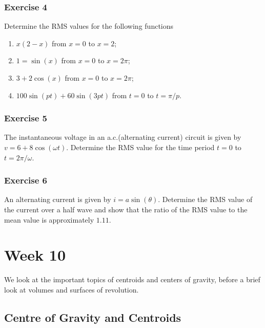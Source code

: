 \documentclass[
  11pt,
  oneside]{book}
\providecommand{\tightlist}{%
  \setlength{\itemsep}{0pt}\setlength{\parskip}{0pt}}
\newcommand{\slide}{}
\theoremstyle{definition}
\theoremstyle{definition}
\theoremstyle{definition}
\theoremstyle{definition}
\theoremstyle{remark}
\begin{document}
\subsection*{Exercise 4}\label{exercise-4-5}

Determine the RMS values for the following functions

\begin{enumerate}
\def\labelenumi{\arabic{enumi}.}
\tightlist
\item
  \(x(2-x)\) from \(x=0\) to \(x=2\);
\item
  \(1=\sin(x)\) from \(x=0\) to \(x=2\pi\);
\item
  \(3+2\cos(x)\) from \(x=0\) to \(x=2\pi\);
\item
  \(100\sin(pt)+60\sin(3pt)\) from \(t=0\) to \(t=\pi/p\).
\end{enumerate}

\slide

\subsection*{Exercise 5}\label{exercise-5-4}

The instantaneous voltage in an a.c.(alternating current) circuit is given by \(v = 6 + 8\cos(\omega t)\).
Determine the RMS value for the time period \(t = 0\) to \(t = 2\pi/\omega\).

\slide

\subsection*{Exercise 6}\label{exercise-6-4}

An alternating current is given by \(i = a\sin(\theta)\). Determine the RMS value of the current over a half wave and show that the ratio of the RMS value to the mean value is approximately \(1.11\).

\chapter{Week 10}\label{week-ten}

We look at the important topics of centroids and centers of gravity, before a brief look at volumes and surfaces of revolution.

\slide

\section{Centre of Gravity and Centroids}\label{centre-of-gravity-and-centroids}
\end{document}
